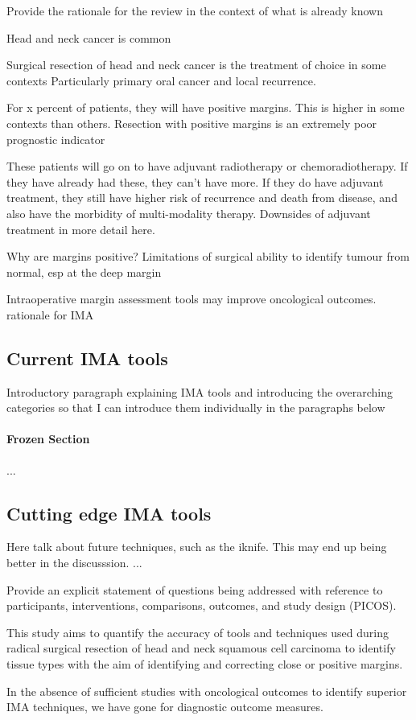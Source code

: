
Provide the rationale for the review in the context of what is already known

Head and neck cancer is common

Surgical resection of head and neck cancer is the treatment of choice in some contexts
Particularly primary oral cancer and local recurrence.

For x percent of patients, they will have positive margins. 
This is higher in some contexts than others.
Resection with positive margins is an extremely poor prognostic indicator

These patients will go on to have adjuvant radiotherapy or chemoradiotherapy.
If they have already had these, they can't have more.
If they do have adjuvant treatment, they still have higher risk of recurrence and death from disease, and also have the morbidity of multi-modality therapy.
Downsides of adjuvant treatment in more detail here.

Why are margins positive?
Limitations of surgical ability to identify tumour from normal, esp at the deep margin



Intraoperative margin assessment tools may improve oncological outcomes.
rationale for IMA

\subsection{Current IMA tools}

Introductory paragraph explaining IMA tools and introducing the overarching categories so that I can introduce them individually in the paragraphs below

\paragraph{Frozen Section}



...

\subsection{Cutting edge IMA tools}

Here talk about future techniques, such as the iknife. 
This may end up being better in the discusssion.
...



Provide an explicit statement of questions being addressed with reference to participants, interventions, comparisons, outcomes, and study design (PICOS). 

This study aims to quantify the accuracy of tools and techniques used during radical surgical resection of head and neck squamous cell carcinoma to identify tissue types with the aim of identifying and correcting close or positive margins.


In the absence of sufficient studies with oncological outcomes to identify superior IMA techniques, we have gone for diagnostic outcome measures.
